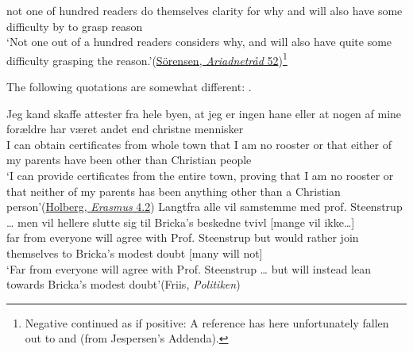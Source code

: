  not one of {hundred} readers do themselves clarity for why and will also have some difficulty by to grasp reason\\
\glt `Not one out of a hundred readers considers why, and will also have quite some difficulty grasping the reason.'\hfill(\href{https://archive.org/details/enariadnetrdgen00srgoog/page/n63/mode/2up?view=theater&q=%22ikke+en+af%22}{Sörensen, \textit{Ariadnetråd} 52})\footnote{Negative continued as if positive: A reference has here unfortunately fallen out to \citet[\href{https://archive.org/details/nordisktidsskrif08kb/page/n17/mode/2up?view=theater}{8ff}]{siesbye1899stroebemerkninger} and \citet[\href{https://archive.org/details/dania00samfgoog/page/n51/mode/2up?view=theater}{44}]{siesbye1903kuriosa} (from Jespersen's Addenda). \eds} %
\z
\z

The following quotations are somewhat different: .

\ea \label{ex:06-61}
\ea
 \gll Jeg kand skaffe attester fra hele byen, at jeg er ingen hane eller at nogen af mine forældre har været andet end christne mennisker\\ %
 I can obtain certificates from whole town that I am no rooster or that either of my parents have been other than Christian people\\
\glt `I can provide certificates from the entire town, proving that I am no rooster or that neither of my parents has been anything other than a Christian person'\hfill(\href{http://holbergsskrifter.dk/holberg-public/view?docId=skuespill%2FErasmus%2FErasmus.page&brand=&chunk.id=act4sc2&toc.id=act4&toc.depth=1}{Holberg, \textit{Erasmus} 4.2}) %
\ex
 \gll Langtfra alle vil samstemme med prof. Steenstrup {\dots} men vil hellere slutte sig til Bricka's beskedne tvivl \phantom{x} [mange vil ikke{\dots}]\\
 {far from} everyone will agree with Prof. Steenstrup {} but would rather join themselves to Bricka's modest doubt \phantom{x} [many will not]\\
\glt `Far from everyone will agree with Prof. Steenstrup {\dots} but will instead lean towards Bricka's modest doubt'\hfill(Friis, \textit{Politiken}) %
\z
\z


